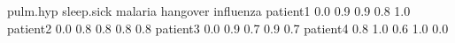 \begin{Schunk}
% --begin: "comp.circ.unavoid"
\begin{Soutput}
         pulm.hyp sleep.sick malaria hangover influenza
patient1      0.0        0.9     0.9      0.8       1.0
patient2      0.0        0.8     0.8      0.8       0.8
patient3      0.0        0.9     0.7      0.9       0.7
patient4      0.8        1.0     0.6      1.0       0.0
\end{Soutput}
%
% --end: "comp.circ.unavoid"
\end{Schunk}
